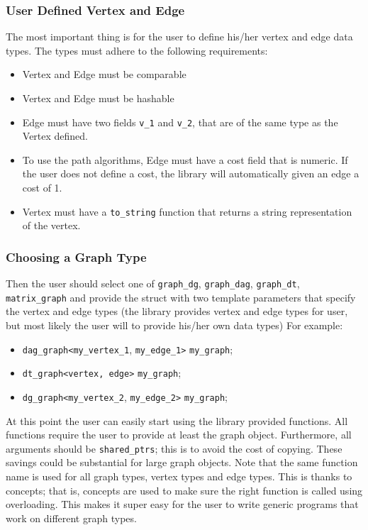 \documentclass{article}
\begin{document}
\subsubsection{User Defined Vertex and Edge}
The most important thing is for the user to define his/her vertex and edge data types. The types must adhere to the following requirements:
\begin{itemize}
\item Vertex and Edge must be comparable
\item Vertex and Edge must be hashable
\item Edge must have two fields \texttt{v\_1} and \texttt{v\_2}, that are of the same type as the Vertex defined.
\item To use the path algorithms, Edge must have a cost field that is numeric. If the user does not define a cost, the library will automatically given an edge a cost of 1.
\item Vertex must have a \texttt{to\_string} function that returns a string representation of the vertex. 
\end{itemize}
\subsubsection{Choosing a Graph Type}
Then the user should select one of \texttt{graph\_dg}, \texttt{graph\_dag}, \texttt{graph\_dt}, \texttt{matrix\_graph} and provide the struct with two template parameters that specify the vertex and edge types (the library provides vertex and edge types for user, but most likely the user will to provide his/her own data types) 
For example: 
\begin{itemize}
\item \texttt{dag\_graph<}\texttt{my\_vertex\_1}, \texttt{my\_edge\_1>} \texttt{my\_graph}; 
\item \texttt{dt\_graph<vertex, edge>} \texttt{my\_graph}; 
\item \texttt{dg\_graph<}\texttt{my\_vertex\_2}, \texttt{my\_edge\_2>} \texttt{my\_graph};
\end{itemize}
 At this point the user can easily start using the library provided functions. All functions require the user to provide at least the graph object. Furthermore, all arguments should be \texttt{shared\_ptrs}; this is to avoid the cost of copying. These savings could be substantial for large graph objects.
Note that the same function name is used for all graph types, vertex types and edge types. This is thanks to concepts; that is, concepts are used to make sure the right function is called using overloading. This makes it super easy for the user to write generic programs that work on different graph types. 
\end{document}
